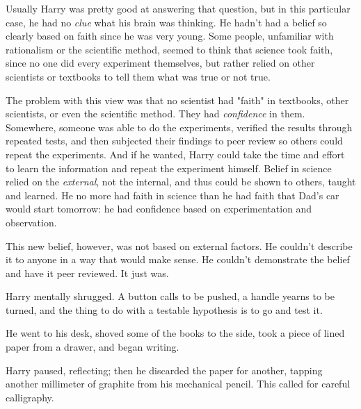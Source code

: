 Usually Harry was pretty good at answering that question,
but in this particular case, he had no \emph{clue} what his brain
was thinking. He hadn't had a belief so clearly based on
faith since he was very young. Some people, unfamiliar
with rationalism or the scientific method, seemed to think
that science took faith, since no one did every experiment
themselves, but rather relied on other scientists or
textbooks to tell them what was true or not true.

The problem with this view was that no scientist had
"faith" in textbooks, other scientists, or even the scientific
method. They had \emph{confidence} in them. Somewhere,
someone was able to do the experiments, verified the
results through repeated tests, and then subjected their
findings to peer review so others could repeat the
experiments. And if he wanted, Harry could take the time
and effort to learn the information and repeat the
experiment himself. Belief in science relied on the \emph{external},
not the internal, and thus could be shown to others,
taught and learned. He no more had faith in science than
he had faith that Dad's car would start tomorrow: he had
confidence based on experimentation and observation.

This new belief, however, was not based on external
factors. He couldn't describe it to anyone in a way that
would make sense. He couldn't demonstrate the belief and
have it peer reviewed. It just was.

Harry mentally shrugged. A button calls to be pushed, a
handle yearns to be turned, and the thing to do with a
testable hypothesis is to go and test it.

He went to his desk, shoved some of the books to the
side, took a piece of lined paper from a drawer, and began writing.

\begin{writtenNote}
\end{writtenNote}

Harry paused, reflecting; then he discarded the paper for another, tapping another
millimeter of graphite from his mechanical pencil. This called for careful
calligraphy.

